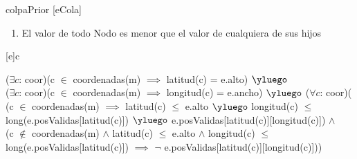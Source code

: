 \begin{Representacion}

	\begin{Estructura}{ colpaPrior }[eCola]
		\begin{Tupla}[eCola]
		\end{Tupla}
		\begin{Tupla}[Nodo]
		\end{Tupla}
	\end{Estructura}


	\begin{enumerate}
		
		\item El valor de todo Nodo es menor que el valor de cualquiera de sus hijos

	\end{enumerate}
	




	{c}
	{
		


		($\exists c$: coor)(c $\in$ coordenadas(m) $\implies$ latitud(c) = e.alto) $\yluego$ \\
		($\exists c$: coor)(c $\in$ coordenadas(m) $\implies$ longitud(c) = e.ancho) $\yluego$ 
		($\forall c$: coor)( \\
			(c $\in$ coordenadas(m) $\implies$ 
				latitud(c) $\leq$ e.alto $\yluego$
				longitud(c) $\leq$ long(e.posValidas[latitud(c)]) $\yluego$ 
				e.posValidas[latitud(c)][longitud(c)]) $\land$ \\
			(c $\not\in$ coordenadas(m) $\land$ latitud(c) $\leq$ e.alto $\land$ longitud(c) $\leq$ long(e.posValidas[latitud(c)]) $\implies$ $\neg$ e.posValidas[latitud(c)][longitud(c)]))
	}
\end{Representacion}

